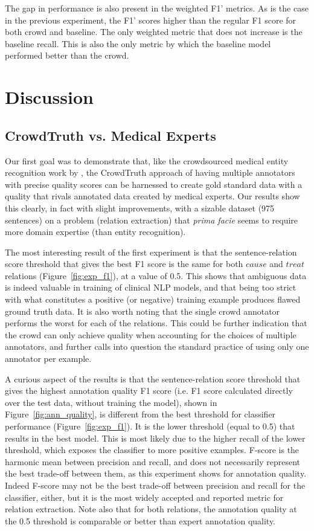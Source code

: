 The gap in performance is also present in the weighted F1' metrics. As is the case in the previous experiment, the F1' scores higher than the regular F1 score for both crowd and baseline. The only weighted metric that does not increase is the baseline recall. This is also the only metric by which the baseline model performed better than the crowd.


\section{Discussion}

\subsection{CrowdTruth vs. Medical Experts}
\label{sec:ct-exp}

Our first goal was to demonstrate that, like the crowdsourced medical entity recognition work by \cite{zhai2013web}, the CrowdTruth approach of having multiple annotators with precise quality scores can be harnessed to create gold standard data with a quality that rivals annotated data created by medical experts.  Our results show this clearly, in fact with slight improvements, with a sizable dataset (975 sentences) on a problem (relation extraction) that {\em prima facie} seems to require more domain expertise (than entity recognition).

The most interesting result of the first experiment is that the sentence-relation score threshold that gives the best F1 score is the same for both $cause$ and $treat$ relations (Figure~\ref{fig:exp_f1}), at a value of 0.5. This shows that ambiguous data is indeed valuable in training of clinical NLP models, and that being too strict with what constitutes a positive (or negative) training example produces flawed ground truth data. It is also worth noting that the single crowd annotator performs the worst for each of the relations. This could be further indication that the crowd can only achieve quality when accounting for the choices of multiple annotators, and further calls into question the standard practice of using only one annotator per example.

A curious aspect of the results is that the sentence-relation score threshold that gives the highest annotation quality F1 score (i.e. F1 score calculated directly over the test data, without training the model), shown in Figure~\ref{fig:ann_quality}, is different from the best threshold for classifier performance (Figure~\ref{fig:exp_f1}). It is the lower threshold (equal to 0.5) that results in the best model. This is most likely due to the higher recall of the lower threshold, which exposes the classifier to more positive examples.  F-score is the harmonic mean between precision and recall, and does not necessarily represent the best trade-off between them, as this experiment shows for annotation quality.  Indeed F-score may not be the best trade-off between precision and recall for the classifier, either, but it is the most widely accepted and reported metric for relation extraction.  Note also that for both relations, the annotation quality at the 0.5 threshold is comparable or better than expert annotation quality.

